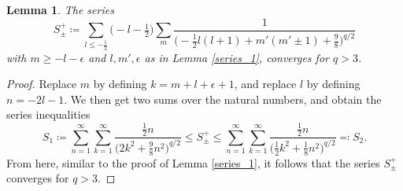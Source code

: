 \documentclass{amsart}
\newtheorem{lemma}[theorem]{Lemma}
\theoremstyle{definition}
\theoremstyle{remark}
\numberwithin{equation}{section}
\begin{document}
\begin{lemma}\label{series_2}
    The series
    \begin{equation*}
        S^+_\pm\coloneq\sum_{l\leq-\tfrac{1}{2}}\Big(-l-\tfrac{1}{2}\Big)\sum_m\frac{1}{\Big(-\tfrac{1}{2}l(l+1)+m'(m'\pm 1)+\tfrac{9}{8}\Big)^{q/2}}
    \end{equation*}
    with $m\geq-l-\epsilon$ and $l,m',\epsilon$ as in Lemma \ref{series_1}, converges for $q>3$.
\end{lemma}
\begin{proof}
    Replace $m$ by defining $k=m+l+\epsilon+1$, and replace $l$ by defining $n=-2l-1$. We then get two sums over the natural numbers, and obtain the series inequalities
    \begin{equation*}
            S_1\coloneq\sum_{n=1}^\infty\sum_{k=1}^\infty\frac{\tfrac{1}{2}n}{\Big(2k^2+\tfrac{9}{8}n^2\Big)^{q/2}}\leq S^+_\pm \leq \sum_{n=1}^\infty\sum_{k=1}^\infty\frac{\tfrac{1}{2}n}{\Big(\tfrac{1}{2}k^2+\tfrac{1}{8}n^2\Big)^{q/2}}\eqcolon S_2.
    \end{equation*}
    From here, similar to the proof of Lemma \ref{series_1}, it follows that the series $S^+_\pm$ converges for $q>3$.
\end{proof}
\end{document}
